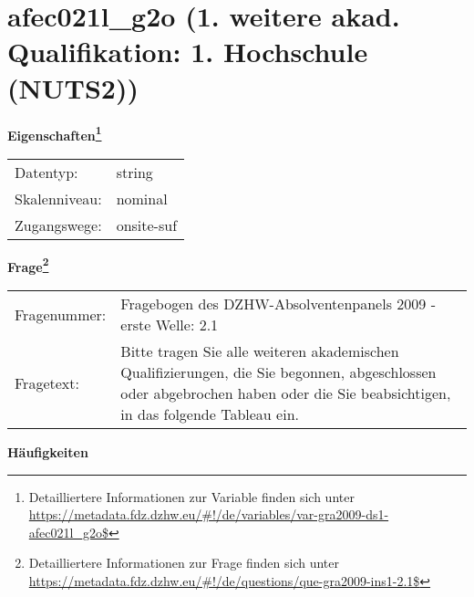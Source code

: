 
    \setcounter{footnote}{0}

    \vspace*{-1.8cm}
	\section{afec021l\_g2o (1. weitere akad. Qualifikation: 1. Hochschule (NUTS2))}
	\label{section:afec021l_g2o}



    \vspace*{0.5cm}
    \noindent\textbf{Eigenschaften\footnote{Detailliertere Informationen zur Variable finden sich unter
		\url{https://metadata.fdz.dzhw.eu/\#!/de/variables/var-gra2009-ds1-afec021l_g2o$}}}\\
	\begin{tabularx}{\hsize}{@{}lX}
	Datentyp: & string \\
	Skalenniveau: & nominal \\
	Zugangswege: &
	  onsite-suf
 \\
    \end{tabularx}



				\vspace*{0.5cm}
                \noindent\textbf{Frage\footnote{Detailliertere Informationen zur Frage finden sich unter
		              \url{https://metadata.fdz.dzhw.eu/\#!/de/questions/que-gra2009-ins1-2.1$}}}\\
				\begin{tabularx}{\hsize}{@{}lX}
					Fragenummer: &
					  Fragebogen des DZHW-Absolventenpanels 2009 - erste Welle:
					  2.1
 \\
					Fragetext: & Bitte tragen Sie alle weiteren akademischen Qualifizierungen, die Sie begonnen, abgeschlossen oder abgebrochen haben oder die Sie beabsichtigen, in das folgende Tableau ein. \\
				\end{tabularx}





        		\vspace*{0.5cm}
                \noindent\textbf{Häufigkeiten}

